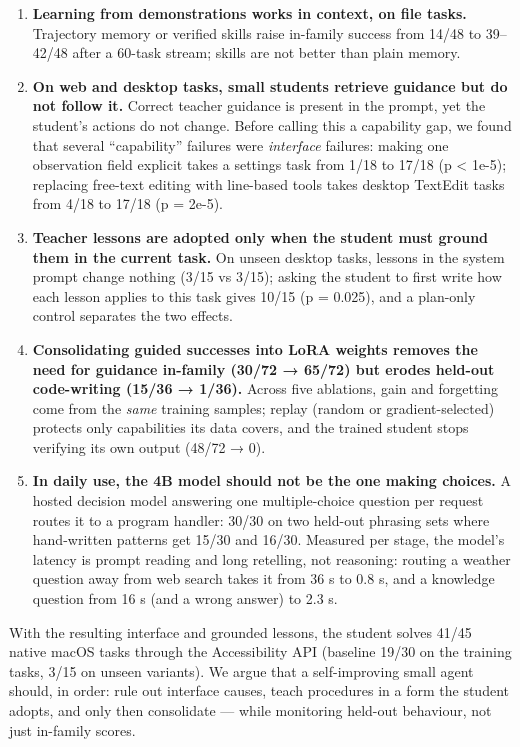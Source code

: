 \documentclass[
  10pt,
]{article}
\providecommand{\tightlist}{%
  \setlength{\itemsep}{0pt}\setlength{\parskip}{0pt}}
\begin{document}
\begin{enumerate}
\def\labelenumi{\arabic{enumi}.}
\tightlist
\item
  \textbf{Learning from demonstrations works in context, on file tasks.}
  Trajectory memory or verified skills raise in-family success from
  14/48 to 39--42/48 after a 60-task stream; skills are not better than
  plain memory.
\item
  \textbf{On web and desktop tasks, small students retrieve guidance but
  do not follow it.} Correct teacher guidance is present in the prompt,
  yet the student's actions do not change. Before calling this a
  capability gap, we found that several ``capability'' failures were
  \emph{interface} failures: making one observation field explicit takes
  a settings task from 1/18 to 17/18 (p \textless{} 1e-5); replacing
  free-text editing with line-based tools takes desktop TextEdit tasks
  from 4/18 to 17/18 (p = 2e-5).
\item
  \textbf{Teacher lessons are adopted only when the student must ground
  them in the current task.} On unseen desktop tasks, lessons in the
  system prompt change nothing (3/15 vs 3/15); asking the student to
  first write how each lesson applies to this task gives 10/15 (p =
  0.025), and a plan-only control separates the two effects.
\item
  \textbf{Consolidating guided successes into LoRA weights removes the
  need for guidance in-family (30/72 → 65/72) but erodes held-out
  code-writing (15/36 → 1/36).} Across five ablations, gain and
  forgetting come from the \emph{same} training samples; replay (random
  or gradient-selected) protects only capabilities its data covers, and
  the trained student stops verifying its own output (48/72 → 0).
\item
  \textbf{In daily use, the 4B model should not be the one making
  choices.} A hosted decision model answering one multiple-choice
  question per request routes it to a program handler: 30/30 on two
  held-out phrasing sets where hand-written patterns get 15/30 and
  16/30. Measured per stage, the model's latency is prompt reading and
  long retelling, not reasoning: routing a weather question away from
  web search takes it from 36 s to 0.8 s, and a knowledge question from
  16 s (and a wrong answer) to 2.3 s.
\end{enumerate}

With the resulting interface and grounded lessons, the student solves
41/45 native macOS tasks through the Accessibility API (baseline 19/30
on the training tasks, 3/15 on unseen variants). We argue that a
self-improving small agent should, in order: rule out interface causes,
teach procedures in a form the student adopts, and only then consolidate
--- while monitoring held-out behaviour, not just in-family scores.
\end{document}
